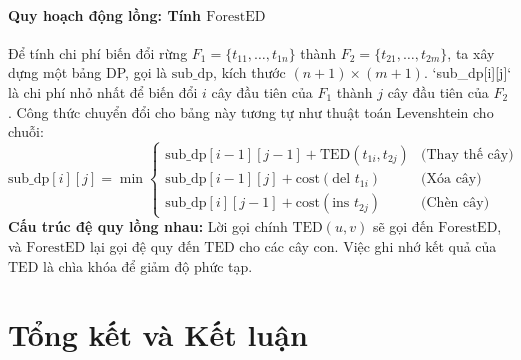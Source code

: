 \documentclass[a4paper,12pt]{article}
\begin{document}
\paragraph{Quy hoạch động lồng: Tính $\text{ForestED}$}
Để tính chi phí biến đổi rừng $F_1 = \{t_{11}, \dots, t_{1n}\}$ thành $F_2 = \{t_{21}, \dots, t_{2m}\}$, ta xây dựng một bảng DP, gọi là $\text{sub\_dp}$, kích thước $(n+1) \times (m+1)$. `sub_dp[i][j]` là chi phí nhỏ nhất để biến đổi $i$ cây đầu tiên của $F_1$ thành $j$ cây đầu tiên của $F_2$.
Công thức chuyển đổi cho bảng này tương tự như thuật toán Levenshtein cho chuỗi:
\[
\text{sub\_dp}[i][j] = \min
\begin{cases}
    \text{sub\_dp}[i-1][j-1] + \text{TED}(t_{1i}, t_{2j}) & \text{(Thay thế cây)} \\
    \text{sub\_dp}[i-1][j] + \text{cost}(\text{del } t_{1i}) & \text{(Xóa cây)} \\
    \text{sub\_dp}[i][j-1] + \text{cost}(\text{ins } t_{2j}) & \text{(Chèn cây)}
\end{cases}
\]
\textbf{Cấu trúc đệ quy lồng nhau:} Lời gọi chính $\text{TED}(u,v)$ sẽ gọi đến $\text{ForestED}$, và $\text{ForestED}$ lại gọi đệ quy đến $\text{TED}$ cho các cây con. Việc ghi nhớ kết quả của $\text{TED}$ là chìa khóa để giảm độ phức tạp.
        

\section{Tổng kết và Kết luận}
\end{document}
